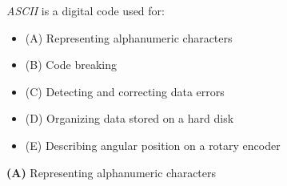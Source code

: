 

{\it ASCII} is a digital code used for:

\begin{itemize}
\item{(A)} Representing alphanumeric characters
\vskip 5pt 
\item{(B)} Code breaking
\vskip 5pt 
\item{(C)} Detecting and correcting data errors
\vskip 5pt 
\item{(D)} Organizing data stored on a hard disk
\vskip 5pt 
\item{(E)} Describing angular position on a rotary encoder
\end{itemize}







{\bf (A)} Representing alphanumeric characters
 










